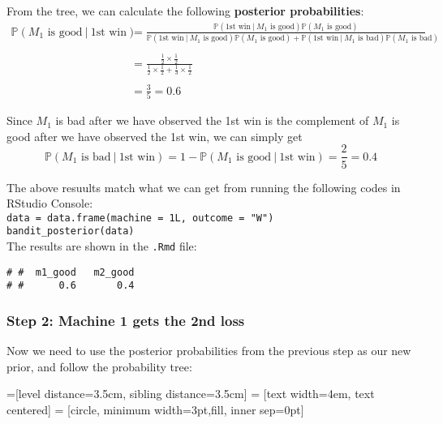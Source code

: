 \documentclass{article}
\def\dsst{\displaystyle}
\begin{document}
From the tree, we can calculate the following \textbf{posterior probabilities}:
\begin{align*}
\mathbb{P}(M_1\text{ is good}~|~\text{1st win}) & = \dsst \frac{\mathbb{P}(\text{1st win}~|~M_1\text{ is good})\mathbb{P}(M_1\text{ is good})}{\mathbb{P}(\text{1st win}~|~M_1\text{ is good})\mathbb{P}(M_1\text{ is good}) + \mathbb{P}(\text{1st win}~|~M_1\text{ is bad})\mathbb{P}(M_1\text{ is bad})}\\
&  \\
& = \frac{\dsst \frac{1}{2}\times \frac{1}{2}}{\dsst \frac{1}{2}\times\frac{1}{2}+\frac{1}{3}\times\frac{1}{2}} \\
&  \\
& = \frac{3}{5} = 0.6
\end{align*}

Since $M_1$ is bad after we have observed the 1st win is the complement of $M_1$ is good after we have observed the 1st win, we can simply get
$$ \mathbb{P}(M_1\text{ is bad}~|~\text{1st win}) = 1-\mathbb{P}(M_1\text{ is good}~|~ \text{1st win}) = \frac{2}{5} = 0.4 $$
\newpage

The above resuults match what we can get from running the following codes in RStudio Console:\\ %

\verb|data = data.frame(machine = 1L, outcome = "W")|\\
\verb|bandit_posterior(data)|\\

The results are shown in the \verb|.Rmd| file:
\begin{lstlisting}
# #  m1_good   m2_good
# #      0.6       0.4
\end{lstlisting}

\subsubsection*{Step 2: Machine 1 gets the 2nd loss}

Now we need to use the posterior probabilities from the previous step as our new prior, and follow the probability tree:

=[level distance=3.5cm, sibling distance=3.5cm]
 = [text width=4em, text centered]
 = [circle, minimum width=3pt,fill, inner sep=0pt]
\end{document}

